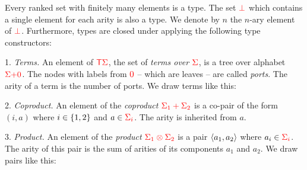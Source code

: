 \begin{definition}[Types] \label{def:types} Every  ranked set with finitely many elements is a type. The set ${\color{red}{\bot}}$ which contains a single  element for each arity is also a type. We denote by $n$ the $n$-ary element of ${\color{red}{\bot}}$.  Furthermore, types are closed under applying the following type constructors:
    \smallskip 
    
    1. \emph{Terms.} An element of ${\color{red}{\mathsf T}} {\color{red}{\Sigma}}$, the set of \emph{terms over ${\color{red}{\Sigma}}$}, is a tree over alphabet ${\color{red}{\Sigma}} {\color{red}{+}} {{\color{red}{ 0}}}$.  The nodes with labels from ${{\color{red}{ 0}}}$  -- which are leaves --  are called \emph{ports}. The arity of a term is the number of ports. We draw terms like this:
            \smallskip
            
    2. \emph{Coproduct.} An element of the \emph{coproduct} ${\color{red}{\Sigma_1 + \Sigma_2}}$ is a co-pair of the form  $(i,a)$ where $i \in \{1,2\}$ and $a \in {\color{red}{\Sigma_i}}$. The arity is inherited from $a$. 
      

                  \smallskip
            
     3. \emph{Product.} An element of the   \emph{product} %
 ${\color{red}{\Sigma_1 \otimes \Sigma_2}}$  is a  pair $\langle{a_1,a_2}\rangle$ where $a_i \in {\color{red}{\Sigma_i}}$. The arity  of this pair is the sum of arities of its components $a_1$ and $a_2$. We draw pairs like this:
            \smallskip
            

\end{definition}
